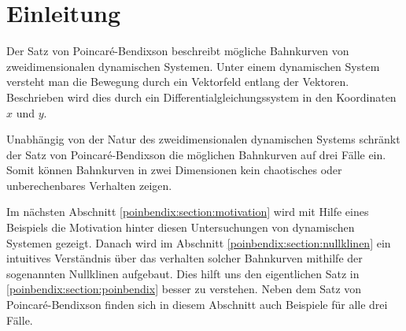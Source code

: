 \section{Einleitung} \label{poinbendix:section:einleitung}

Der Satz von Poincaré-Bendixson beschreibt mögliche Bahnkurven von zweidimensionalen dynamischen Systemen.
Unter einem dynamischen System versteht man die Bewegung durch ein Vektorfeld entlang der Vektoren.
Beschrieben wird dies durch ein Differentialgleichungssystem in den Koordinaten $x$ und $y$.

Unabhängig von der Natur des zweidimensionalen dynamischen Systems schränkt der Satz von Poincaré-Bendixson die möglichen Bahnkurven auf drei Fälle ein.
Somit können Bahnkurven in zwei Dimensionen kein chaotisches oder unberechenbares Verhalten zeigen.

Im nächsten Abschnitt \ref{poinbendix:section:motivation} wird mit Hilfe eines Beispiels die Motivation hinter diesen Untersuchungen von dynamischen Systemen gezeigt.
Danach wird im Abschnitt \ref{poinbendix:section:nullklinen} ein intuitives Verständnis über das verhalten solcher Bahnkurven mithilfe der sogenannten Nullklinen aufgebaut.
Dies hilft uns den eigentlichen Satz in \ref{poinbendix:section:poinbendix} besser zu verstehen.
Neben dem Satz von Poincaré-Bendixson finden sich in diesem Abschnitt auch Beispiele für alle drei Fälle.

